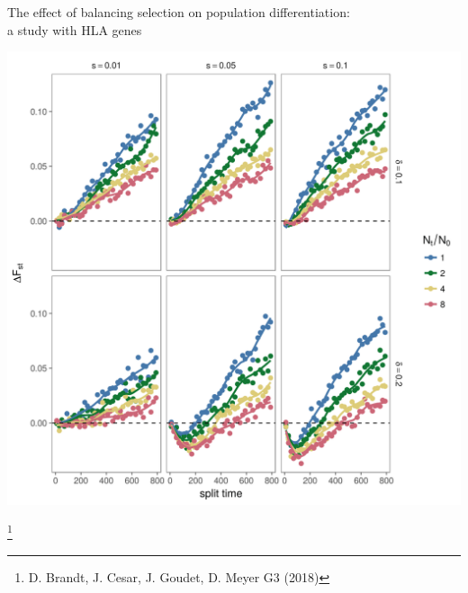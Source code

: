 \documentclass[10pt]{beamer}
\begin{document}
\begin{frame}{\small The effect of balancing selection on population
    differentiation:\\ a study with HLA genes}
\begin{minipage}{0.43\textwidth}
  \end{minipage}
  \begin{minipage}{0.43\textwidth}
    \includegraphics[width=\textwidth]{./Figures/DFst_zoom.png}
  \end{minipage}
  \let\thefootnote\relax\footnote{D. Brandt, J. Cesar, J. Goudet, D. Meyer G3
    (2018)}
\end{frame}
\end{document}
